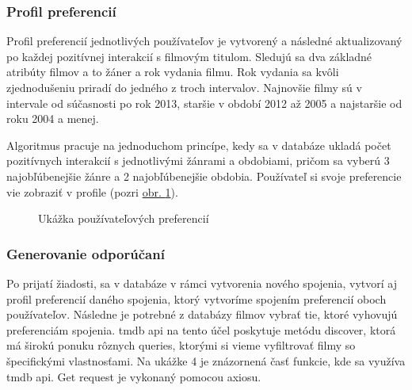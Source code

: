 \subsubsection{Profil preferencií}
Profil preferencií jednotlivých používateľov je vytvorený a následné aktualizovaný po každej pozitívnej interakcií s filmovým titulom. Sledujú sa dva základné atribúty filmov a to žáner a rok vydania filmu. Rok vydania sa kvôli zjednodušeniu priradí do jedného z troch intervalov. Najnovšie filmy sú v intervale od súčasnosti po rok 2013, staršie v období 2012 až 2005 a najstaršie od roku 2004 a menej.

Algoritmus pracuje na jednoduchom princípe, kedy sa v databáze ukladá počet pozitívnych interakcií s jednotlivými žánrami a obdobiami, pričom sa vyberú 3 najobľúbenejšie žánre a 2 najobľúbenejšie obdobia. Používateľ si svoje preferencie vie zobraziť v profile (pozri \hyperref[userprofile]{obr. \ref{userprofile}}).
\vspace{85mm}
\begin{figure}[hbt!]
  \centering   
  \def\stackalignment{c}
           \scriptsize
	\caption{Ukážka používateľových preferencií}  
  \label{userprofile}
\end{figure}

\subsubsection{Generovanie odporúčaní}
Po prijatí žiadosti, sa v databáze v rámci vytvorenia nového spojenia, vytvorí aj profil preferencií daného spojenia, ktorý vytvoríme spojením preferencií oboch používateľov. Následne je potrebné z databázy filmov vybrať tie, ktoré vyhovujú preferenciám spojenia. \acrshort{tmdb} \acrshort{api} na tento účel poskytuje metódu discover, ktorá má širokú ponuku rôznych queries, ktorými si vieme vyfiltrovať filmy so špecifickými vlastnosťami. Na ukážke 4 je znázornená časť funkcie, kde sa využíva \acrshort{tmdb} \acrshort{api}. Get request je vykonaný pomocou axiosu.

